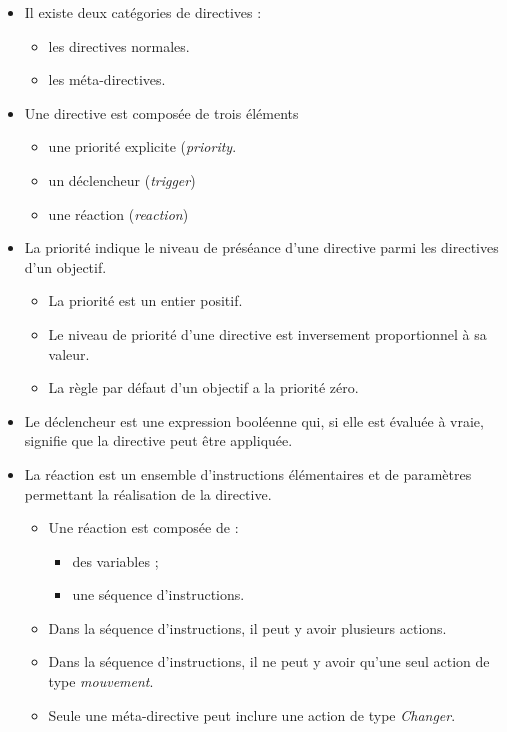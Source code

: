 \begin{itemize}
    \item Il existe deux catégories de directives :
        \begin{itemize}
            \item les directives normales.
            \item les méta-directives.
        \end{itemize}
    \item Une directive est composée de trois éléments
        \begin{itemize}
            \item une priorité explicite (\textit{priority}.
            \item un déclencheur (\textit{trigger})
            \item une réaction (\textit{reaction})
        \end{itemize}
    \item La priorité indique le niveau de préséance d'une directive parmi les directives d'un objectif. 
        \begin{itemize}
            \item La priorité est un entier positif.
            \item Le niveau de priorité d'une directive est inversement proportionnel à sa valeur.
            \item La règle par défaut d'un objectif a la priorité zéro.
        \end{itemize}
    \item Le déclencheur est une expression booléenne qui, si elle est évaluée à vraie, signifie que la directive peut être appliquée.
    \item La réaction est un ensemble d'instructions élémentaires et de paramètres permettant la réalisation de la directive.
    \begin{itemize}
    \item Une réaction est composée de :
        \begin{itemize}
            \item des variables ;
            \item une séquence d'instructions.
        \end{itemize}
        \item Dans la séquence d'instructions, il peut y avoir plusieurs actions.
        \item Dans la séquence d'instructions, il ne peut y avoir qu'une seul action de type \textit{mouvement}.
        \item Seule une méta-directive peut inclure une action de type \textit{Changer}.
    \end{itemize}
\end{itemize}

